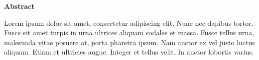 \clearpage
\setcounter{page}{1}

{\Huge \textbf{Abstract}}

\vspace{15mm}

Lorem ipsum dolor sit amet, consectetur adipiscing elit. Nunc nec dapibus tortor. Fusce sit amet turpis in urna ultrices aliquam sodales et massa. Fusce tellus urna, malesuada vitae posuere at, porta pharetra ipsum. Nam auctor ex vel justo luctus aliquam. Etiam et ultricies augue. Integer et tellus velit. In auctor lobortis varius.